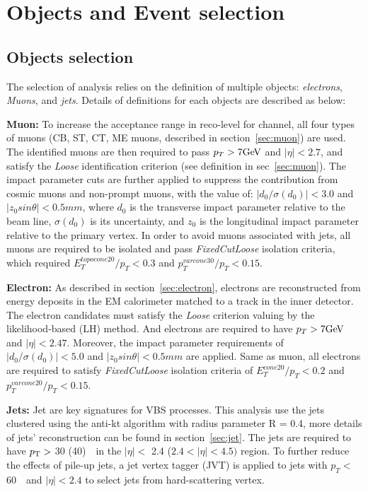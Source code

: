 \section{Objects and Event selection}
\label{sec:selection}

\subsection{Objects selection}

The selection of analysis relies on the definition of multiple objects: \textit{electrons}, \textit{Muons}, and \textit{jets}.
Details of definitions for each objects are described as below:

\textbf{Muon:} 
To increase the acceptance range in reco-level for \lllljj channel, all four types of muons 
(CB, ST, CT, ME muons, described in section~\ref{sec:muon}) are used.
The identified muons are then required to pass $p_{T} > 7 \text{Ge\kern -0.1em V}$ and $|\eta| < 2.7$,
and satisfy the \textit{Loose} identification criterion (see definition in sec~\ref{sec:muon}).
The impact parameter cuts are further applied to suppress the contribution from cosmic muons and non-prompt muons,
with the value of: $|d_{0}/\sigma(d_{0})| < 3.0$ and $|z_{0} sin\theta| < 0.5 mm$,
where $d_{0}$ is the transverse impact parameter relative to the beam line, $\sigma(d_{0})$ is its uncertainty, 
and $z_{0}$ is the longitudinal impact parameter relative to the primary vertex.
In order to avoid muons associated with jets, all muons are required to be isolated and pass \textit{FixedCutLoose} isolation criteria,
which required $E_{T}^{topocone20} / p_{T} < 0.3$ and $p_{T}^{varcone30} / p_{T} < 0.15$.

\textbf{Electron:} 
As described in section~\ref{sec:electron}, electrons are reconstructed from energy deposits in the EM calorimeter matched to a track in the inner detector.
The electron candidates must satisfy the \textit{Loose} criterion valuing by the likelihood-based (LH) method.
And electrons are required to have $p_{T} > 7 \text{Ge\kern -0.1em V}$ and $|\eta| < 2.47$.
Moreover, the impact parameter requirements of $|d_{0}/\sigma(d_{0})| < 5.0$ and $|z_{0} sin\theta| < 0.5 mm$ are applied.
Same as muon, all electrons are required to satisfy \textit{FixedCutLoose} isolation criteria
of $E_{T}^{cone20} / p_{T} < 0.2$ and $p_{T}^{varcone20} / p_{T} < 0.15$.

\textbf{Jets:} 
Jet are key signatures for VBS processes. 
This analysis use the jets clustered using the anti-kt algorithm with radius parameter R = 0.4, more details of jets' reconstruction can be found in section~\ref{sec:jet}.
The jets are required to have $p_{\text{T}} >$ 30 (40)~\gev~in the $|\eta| <$ 2.4 ($2.4 < |\eta| < 4.5)$ region.
To further reduce the effects of pile-up jets, a jet vertex tagger (JVT) is applied to jets with $p_{T} <$ 60~\gev~and $|\eta| < 2.4$ to select jets from hard-scattering vertex.

